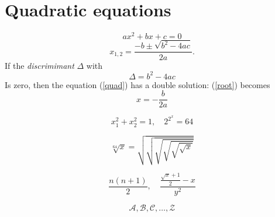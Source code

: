 \documentclass{article}
\begin{document}
\section*{Quadratic equations}
\begin{equation}
  \label{quad}
  ax^2 + bx + c = 0
\end{equation}
\begin{equation}
  \label{root}
  x_{1,2} = \frac{-b \pm \sqrt{b^2-4ac}}{2a}.
\end{equation}
If the \emph{discrimimant} \(\Delta \) with
\[
  \Delta = b^2-4ac
\]
Is zero, then the equation (\ref{quad}) has a double solution:
(\ref{root}) becomes
\[
  x = - \frac{b}{2a}
\]

\[ x_1^2 + x_2^2 = 1, \quad 2^{2^x} = 64  \]

\[ \sqrt[64]{x} = \sqrt{\sqrt{\sqrt{\sqrt{\sqrt{\sqrt{x}}}}}} \]

\[ \frac{n(n+1)}{2}, \quad \frac{\frac{\sqrt{x}+1}{2}-x}{y^2} \]

\[ \mathcal{A}, \mathcal{B}, \mathcal{C}, \ldots, \mathcal{Z} \]
\end{document}
